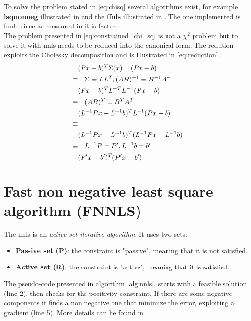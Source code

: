 To solve the problem stated in \ref{eq:chisq} several algorithms exist, for example \textbf{lsqnonneg} illustrated in \cite{nnls} and the \textbf{ffnls} illustrated in \cite{fnnls}. The one implemented is fnnls since as measured in \cite{Chen09nonnegativityconstraints} it is faster.\\
The problem presented in \ref{eq:constrained_chi_sq} is not a $\chi^2$ problem but to solve it with nnls needs to be reduced into the canonical form. The redution exploits the Cholesky decomposition and is illustrated in \ref{eq:reduction}.
\begin{equation}\label{eq:reduction}
  \begin{split}
  & (Px-b)^T\Sigma(x)^-1(Px-b)\\
  \equiv &\quad \Sigma=LL^T,\space (AB)^{-1} = B^{-1} A^{-1}\\
  & (Px-b)^T L^{-T} L^{-1} (Px-b)\\
  \equiv &\quad (AB)^T = B^T A^T \\
  & (L^{-1}Px-L^{-1}b)^T  L^{-1} (Px-b)\\
  \equiv & \\
  & (L^{-1}Px-L^{-1}b)^T (L^{-1}Px-L^{-1}b)\\
  \equiv &\quad L^{-1}P=P', \space L^{-1}b=b' \\
  & (P'x-b')^T(P'x-b')\\
  \end{split}
\end{equation}

\section{Fast non negative least square algorithm (FNNLS)}
The nnls is an \textit{active set iterative algorithm}. It uses two sets: 
\begin{itemize}   
\item \textbf{Passive set (P)}: the constraint is "passive", meaning that it is not satisfied.   
\item \textbf{Active set (R)}:  the constraint is "active", meaning that it is satisfied.   
\end{itemize}   
The pseudo-code presented in algorithm \ref{alg:nnls}, starts with a feasible solution (line 2), then checks for the positivity constraint. If there are some negative components it finds a non negative one that minimize the error, exploiting a gradient (line 5). More details can be found in \cite{nnls}

